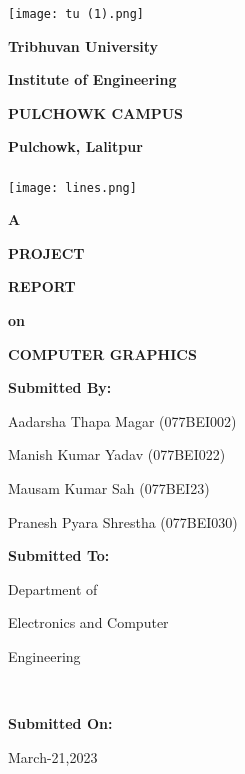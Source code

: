 \documentclass[12pt,a4]{article}
\begin{document}
\begin{titlepage}
\begin{center} \texttt{[image: tu (1).png]}\par
{\large \bfseries Tribhuvan University} \par
{\LARGE \bfseries Institute of Engineering} \par
{\large \bfseries PULCHOWK CAMPUS} \par
{\bfseries Pulchowk, Lalitpur}
~\\~\\
\texttt{[image: lines.png]}\par
{\bfseries A}\par{\bfseries PROJECT}\par{\bfseries REPORT}\par{\bfseries on}\par
{\Large \bfseries COMPUTER GRAPHICS}~\par
\end{center}
\vfill
\begin{minipage}{8cm}
{\bfseries Submitted By:}\par
Aadarsha Thapa Magar (077BEI002)\par
Manish Kumar Yadav (077BEI022)\par
Mausam Kumar Sah (077BEI23)\par
Pranesh Pyara Shrestha (077BEI030)\par
\end{minipage}
\hfill
\begin{minipage}{7cm}
\begin{center}
{\bfseries Submitted To:}\par
Department of\par Electronics and Computer\par Engineering\par
\end{center}
\end{minipage}
\begin{center}
~\par
    {\bfseries Submitted On:}\par
    March-21,2023
\end{center}
\end{titlepage}
\newpage
\tableofcontents
\newpage
\end{document}
